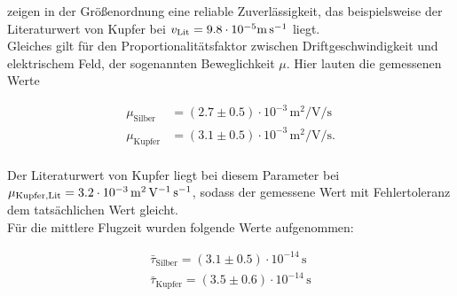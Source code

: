 \noindent zeigen in der Größenordnung eine reliable Zuverlässigkeit, das beispielsweise der Literaturwert von Kupfer bei 
$v_\text{Lit} = 9.8\cdot{}10^{-5}\unit[per-mode=reciprocal]{\meter\per\second}$ liegt.\\

\noindent Gleiches gilt für den Proportionalitätsfaktor zwischen Driftgeschwindigkeit und elektrischem Feld, der 
sogenannten Beweglichkeit $\mu$. Hier lauten die gemessenen Werte 

\begin{align*}
    \mu_\text{Silber} &= \left(2.7 \pm0.5\right)\cdot{}10^{-3}\,\unit{\square\meter\per\volt\per\second}\\
    \mu_\text{Kupfer} &= \left(3.1 \pm0.5\right)\cdot{}10^{-3}\,\unit{\square\meter\per\volt\per\second}.\\
\end{align*}

\noindent Der Literaturwert von Kupfer \cite[292]{Physikalisches_Praktikum} liegt bei diesem Parameter bei $\mu_\text{Kupfer,Lit} = 3.2
\cdot{}10^{-3}\,\unit[per-mode=reciprocal]{\square\meter\per\volt\per\second}$, sodass der gemessene Wert mit Fehlertoleranz dem tatsächlichen 
Wert gleicht.\\

\noindent Für die mittlere Flugzeit wurden folgende Werte aufgenommen:

\begin{align*}
    \bar{\tau}_\text{Silber} = \left(3.1\pm0.5\right)\cdot10^{-14}\,\unit{\second}\\
    \bar{\tau}_\text{Kupfer} = \left(3.5\pm0.6\right)\cdot10^{-14}\,\unit{\second}\\
\end{align*}

